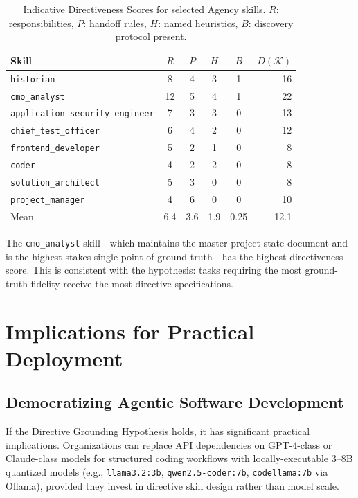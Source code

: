 \documentclass[11pt,a4paper]{article}
\begin{document}
\begin{table}[h]
\centering
\caption{Indicative Directiveness Scores for selected Agency skills.
$R$: responsibilities, $P$: handoff rules, $H$: named heuristics,
$B$: discovery protocol present.}
\label{tab:scores}
\begin{tabular}{lccccr}
\toprule
Skill & $R$ & $P$ & $H$ & $B$ & $D(\mathcal{K})$ \\
\midrule
\texttt{historian}                    & 8  & 4 & 3 & 1 & 16 \\
\texttt{cmo\_analyst}                 & 12 & 5 & 4 & 1 & 22 \\
\texttt{application\_security\_engineer} & 7 & 3 & 3 & 0 & 13 \\
\texttt{chief\_test\_officer}         & 6  & 4 & 2 & 0 & 12 \\
\texttt{frontend\_developer}          & 5  & 2 & 1 & 0 &  8 \\
\texttt{coder}                        & 4  & 2 & 2 & 0 &  8 \\
\texttt{solution\_architect}          & 5  & 3 & 0 & 0 &  8 \\
\texttt{project\_manager}             & 4  & 6 & 0 & 0 & 10 \\
\midrule
Mean & 6.4 & 3.6 & 1.9 & 0.25 & 12.1 \\
\bottomrule
\end{tabular}
\end{table}

The \texttt{cmo\_analyst} skill—which maintains the master project state
document and is the highest-stakes single point of ground truth—has the
highest directiveness score. This is consistent with the hypothesis: tasks
requiring the most ground-truth fidelity receive the most directive
specifications.

\section{Implications for Practical Deployment}
\label{sec:implications}

\subsection{Democratizing Agentic Software Development}

If the Directive Grounding Hypothesis holds, it has significant practical
implications. Organizations can replace API dependencies on GPT-4-class or
Claude-class models for structured coding workflows with locally-executable
3--8B quantized models (e.g., \texttt{llama3.2:3b}, \texttt{qwen2.5-coder:7b},
\texttt{codellama:7b} via Ollama), provided they invest in directive skill
design rather than model scale.
\end{document}

